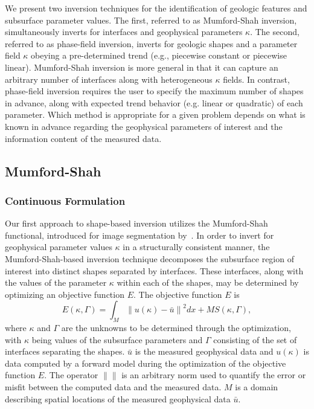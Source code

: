 \documentclass[manuscript,revised]{geophysics}
\newcommand\norm[1]{\left\lVert#1\right\rVert}
\begin{document}
We present two inversion techniques for the identification of geologic features and subsurface parameter values.  The first, referred to as Mumford-Shah inversion, simultaneously inverts for interfaces and geophysical parameters $\kappa$. The second, referred to as phase-field inversion, inverts for geologic shapes and a parameter field $\kappa$ obeying a pre-determined trend (e.g., piecewise constant or piecewise linear). Mumford-Shah inversion is more general in that it can capture an arbitrary number of interfaces along with heterogeneous $\kappa$ fields. In contrast, phase-field inversion requires the user to specify the maximum number of shapes in advance, along with expected trend behavior (e.g. linear or quadratic) of each parameter.  Which method is appropriate for a given problem depends on what is known in advance regarding the geophysical parameters of interest and the information content of the measured data. 

\subsection{Mumford-Shah}
\subsubsection{Continuous Formulation}
Our first approach to shape-based inversion utilizes the Mumford-Shah functional, introduced for image segmentation by~\cite{Mumford_1989}.  In order to invert for geophysical parameter values $\kappa$ in a structurally consistent manner, the Mumford-Shah-based inversion technique decomposes the subsurface region of interest into distinct shapes separated by interfaces. These interfaces, along with the values of the parameter $\kappa$ within each of the shapes, may be determined by optimizing an objective function $E$. The objective function $E$ is
\begin{equation} \label{eq:shape}
E\left(\kappa,\Gamma\right)=\int_M \norm{u(\kappa)-\bar{u}}^2  dx+MS\left(\kappa,\Gamma\right),	
\end{equation}
where $\kappa$ and $\Gamma$ are the unknowns to be determined through the optimization, with $\kappa$ being values of the subsurface parameters and $\Gamma$ consisting of the set of interfaces separating the shapes. $\bar{u}$ is the measured geophysical data and $u(\kappa)$ is data computed by a forward model during the optimization of the objective function $E$. The operator $\norm{}$  is an arbitrary norm used to quantify the error or misfit between the computed data and the measured data. $M$ is a domain describing spatial locations of the measured geophysical data $\bar{u}$. 
\end{document}
